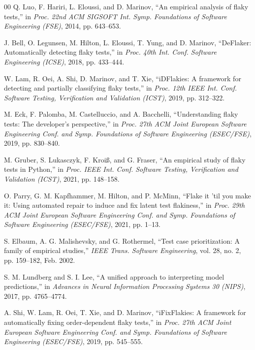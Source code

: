 \documentclass[conference]{IEEEtran}
\begin{document}
\begin{thebibliography}{00}
 Q. Luo, F. Hariri, L. Eloussi, and D. Marinov, ``An empirical analysis of flaky tests,'' in \textit{Proc. 22nd ACM SIGSOFT Int. Symp. Foundations of Software Engineering (FSE)}, 2014, pp. 643--653.

 J. Bell, O. Legunsen, M. Hilton, L. Eloussi, T. Yung, and D. Marinov, ``DeFlaker: Automatically detecting flaky tests,'' in \textit{Proc. 40th Int. Conf. Software Engineering (ICSE)}, 2018, pp. 433--444.

 W. Lam, R. Oei, A. Shi, D. Marinov, and T. Xie, ``iDFlakies: A framework for detecting and partially classifying flaky tests,'' in \textit{Proc. 12th IEEE Int. Conf. Software Testing, Verification and Validation (ICST)}, 2019, pp. 312--322.

 M. Eck, F. Palomba, M. Castelluccio, and A. Bacchelli, ``Understanding flaky tests: The developer's perspective,'' in \textit{Proc. 27th ACM Joint European Software Engineering Conf. and Symp. Foundations of Software Engineering (ESEC/FSE)}, 2019, pp. 830--840.

 M. Gruber, S. Lukasczyk, F. Kroiß, and G. Fraser, ``An empirical study of flaky tests in Python,'' in \textit{Proc. IEEE Int. Conf. Software Testing, Verification and Validation (ICST)}, 2021, pp. 148--158.

 O. Parry, G. M. Kapfhammer, M. Hilton, and P. McMinn, ``Flake it 'til you make it: Using automated repair to induce and fix latent test flakiness,'' in \textit{Proc. 29th ACM Joint European Software Engineering Conf. and Symp. Foundations of Software Engineering (ESEC/FSE)}, 2021, pp. 1--13.

 S. Elbaum, A. G. Malishevsky, and G. Rothermel, ``Test case prioritization: A family of empirical studies,'' \textit{IEEE Trans. Software Engineering}, vol. 28, no. 2, pp. 159--182, Feb. 2002.

 S. M. Lundberg and S. I. Lee, ``A unified approach to interpreting model predictions,'' in \textit{Advances in Neural Information Processing Systems 30 (NIPS)}, 2017, pp. 4765--4774.

 A. Shi, W. Lam, R. Oei, T. Xie, and D. Marinov, ``iFixFlakies: A framework for automatically fixing order-dependent flaky tests,'' in \textit{Proc. 27th ACM Joint European Software Engineering Conf. and Symp. Foundations of Software Engineering (ESEC/FSE)}, 2019, pp. 545--555.


\end{thebibliography}
\end{document}
